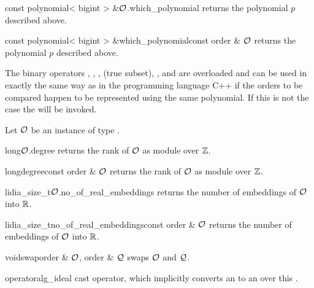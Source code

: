 \begin{cfcode}{const polynomial< bigint > &}{$\mathcal{O}$.which_polynomial}{}
  returns the polynomial $p$ described above.
\end{cfcode}

\begin{fcode}{const polynomial< bigint > &}{which_polynomial}{const order & $\mathcal{O}$}
  returns the polynomial $p$ described above.
\end{fcode}



\COMP

The binary operators \code{==}, \code{!=}, \code{<=}, \code{<} (true subset), \code{>=}, and
\code{>} are overloaded and can be used in exactly the same way as in the programming language
C++ if the orders to be compared happen to be represented using the same polynomial.  If this is
not the case the \LEH will be invoked.



\BASIC

Let $\mathcal{O}$ be an instance of type .

\begin{cfcode}{long}{$\mathcal{O}$.degree}{}
  returns the rank of $\mathcal{O}$ as module over $\mathbb{Z}$.
\end{cfcode}

\begin{fcode}{long}{degree}{const order & $\mathcal{O}$}
  returns the rank of $\mathcal{O}$ as module over $\mathbb{Z}$.
\end{fcode}

\begin{cfcode}{lidia_size_t}{$\mathcal{O}$.no_of_real_embeddings}{}
  returns the number of embeddings of $\mathcal{O}$ into $\mathbb{R}$.
\end{cfcode}

\begin{fcode}{lidia_size_t}{no_of_real_embeddings}{const order & $\mathcal{O}$}
  returns the number of embeddings of $\mathcal{O}$ into $\mathbb{R}$.
\end{fcode}

\begin{fcode}{void}{swap}{order & $\mathcal{O}$, order & $\mathcal{Q}$}
  swaps $\mathcal{O}$ and $\mathcal{Q}$.
\end{fcode}

\begin{cfcode}{operator}{alg_ideal}{}
  cast operator, which implicitly converts an  to an  over this
  .
\end{cfcode}


